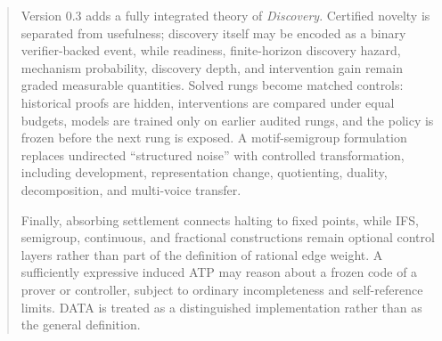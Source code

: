 \documentclass[11pt]{article}
\theoremstyle{remark}
\begin{document}
\begin{abstract}
Version 0.3 adds a fully integrated theory of \emph{Discovery}. Certified novelty is separated from usefulness; discovery itself may be encoded as a binary verifier-backed event, while readiness, finite-horizon discovery hazard, mechanism probability, discovery depth, and intervention gain remain graded measurable quantities. Solved rungs become matched controls: historical proofs are hidden, interventions are compared under equal budgets, models are trained only on earlier audited rungs, and the policy is frozen before the next rung is exposed. A motif-semigroup formulation replaces undirected ``structured noise'' with controlled transformation, including development, representation change, quotienting, duality, decomposition, and multi-voice transfer.

Finally, absorbing settlement connects halting to fixed points, while IFS, semigroup, continuous, and fractional constructions remain optional control layers rather than part of the definition of rational edge weight. A sufficiently expressive induced ATP may reason about a frozen code of a prover or controller, subject to ordinary incompleteness and self-reference limits. DATA is treated as a distinguished implementation rather than as the general definition.
\end{abstract}

\tableofcontents
\clearpage












\end{document}
